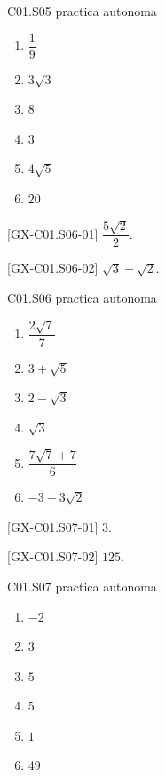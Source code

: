 \begin{shortanswer}{C01.S05 practica autonoma}
\begin{enumerate}[label=\textbf{PX-C01.S05-\arabic*:}, leftmargin=*]
  \item \(\dfrac{1}{9}\)
  \item \(3\sqrt{3}\)
  \item \(8\)
  \item \(3\)
  \item \(4\sqrt{5}\)
  \item \(20\)
\end{enumerate}
\end{shortanswer}

\begin{shortanswer}{[GX-C01.S06-01]}
\(\dfrac{5\sqrt{2}}{2}\).
\end{shortanswer}

\begin{shortanswer}{[GX-C01.S06-02]}
\(\sqrt{3}-\sqrt{2}\).
\end{shortanswer}

\begin{shortanswer}{C01.S06 practica autonoma}
\begin{enumerate}[label=\textbf{PX-C01.S06-\arabic*:}, leftmargin=*]
  \item \(\dfrac{2\sqrt{7}}{7}\)
  \item \(3+\sqrt{5}\)
  \item \(2-\sqrt{3}\)
  \item \(\sqrt{3}\)
  \item \(\dfrac{7\sqrt{7}+7}{6}\)
  \item \(-3-3\sqrt{2}\)
\end{enumerate}
\end{shortanswer}

\begin{shortanswer}{[GX-C01.S07-01]}
\(3\).
\end{shortanswer}

\begin{shortanswer}{[GX-C01.S07-02]}
\(125\).
\end{shortanswer}

\begin{shortanswer}{C01.S07 practica autonoma}
\begin{enumerate}[label=\textbf{PX-C01.S07-\arabic*:}, leftmargin=*]
  \item \(-2\)
  \item \(3\)
  \item \(5\)
  \item \(5\)
  \item \(1\)
  \item \(49\)
\end{enumerate}
\end{shortanswer}
